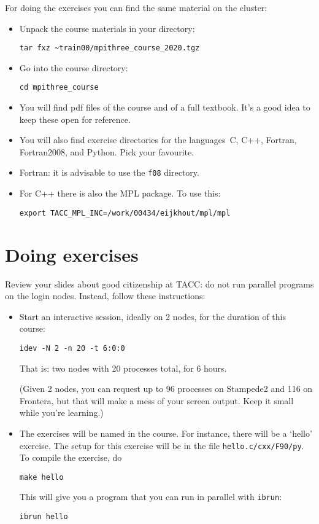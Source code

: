 \documentclass[11pt]{artikel3}
\begin{document}
For doing the exercises you can find the same
material on the cluster:
\begin{itemize}
\item Unpack the course materials in your directory:
\begin{verbatim}
tar fxz ~train00/mpithree_course_2020.tgz
\end{verbatim}
\item Go into the course directory:
\begin{verbatim}
cd mpithree_course
\end{verbatim}
\item You will find pdf files of the course and of a full textbook.
  It's a good idea to keep these open for reference.
\item You will also find exercise directories for the languages~C, C++,
  Fortran, Fortran2008, and Python. Pick your favourite.
\item Fortran: it is advisable to use the \texttt{f08} directory.
\item For C++ there is also the MPL package. To use this:
\begin{verbatim}
export TACC_MPL_INC=/work/00434/eijkhout/mpl/mpl
\end{verbatim}
\end{itemize}

\section{Doing exercises}

Review your slides about good citizenship at TACC:
do not run parallel programs on the login nodes. Instead,
follow these instructions:

\begin{itemize}
\item Start an interactive session, ideally on 2 nodes, for the
  duration of this course:
\begin{verbatim}
idev -N 2 -n 20 -t 6:0:0
\end{verbatim}
That is: two nodes with 20 processes total, for 6 hours.

(Given 2 nodes, you can request up to 96 processes on Stampede2
and 116 on Frontera, but that will make a mess of your screen output.
Keep it small while you're learning.)
\item The exercises will be named in the course. For instance, there
  will be a `hello' exercise. The setup for this exercise will be in
  the file \texttt{hello.c/cxx/F90/py}. To compile the exercise, do
\begin{verbatim}
make hello
\end{verbatim}
This will give you a program that you can run in parallel with \texttt{ibrun}:
\begin{verbatim}
ibrun hello
\end{verbatim}
\end{itemize}
\end{document}
